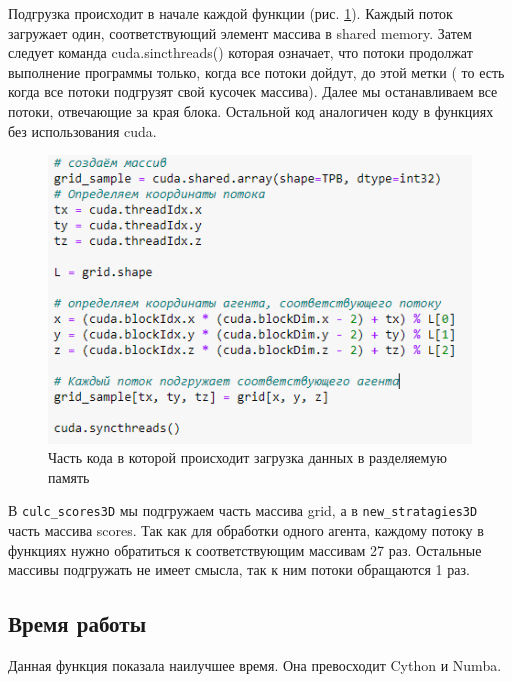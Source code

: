 \documentclass[a4paper,12pt]{article}
\begin{document}
Подгрузка происходит в начале каждой функции (рис. \ref{fig:preloading}). Каждый поток загружает один, соответствующий элемент массива в shared memory. Затем следует команда cuda.sincthreads() которая означает, что потоки продолжат выполнение программы только, когда все потоки дойдут, до этой метки ( то есть когда все потоки подгрузят свой кусочек массива). Далее мы останавливаем все потоки, отвечающие за края блока. Остальной код аналогичен коду в функциях без использования cuda.

\begin{figure}[hbt]
	\centering
	\includegraphics[scale=0.8]{Images/Подгрузка массива.png} 
	\caption{Часть кода в которой происходит загрузка данных в разделяемую память}
	\label{fig:preloading}
\end{figure}

В \verb|culc_scores3D| мы подгружаем часть массива grid, а в \verb|new_stratagies3D| часть массива scores. Так как для обработки одного агента, каждому потоку в функциях нужно обратиться к соответствующим массивам 27 раз. Остальные массивы подгружать не имеет смысла, так к ним потоки обращаются 1 раз.



\subsection{Время работы}

Данная функция показала наилучшее время. Она превосходит Cython и Numba. 
\end{document}
